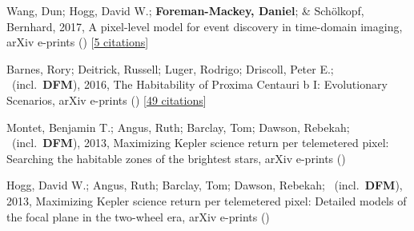 \item[{\color{numcolor}\scriptsize4}] Wang, Dun; Hogg, David W.; \textbf{Foreman-Mackey, Daniel}; \& Sch{\"o}lkopf, Bernhard, 2017, A pixel-level model for event discovery in time-domain imaging, arXiv e-prints () [\href{https://ui.adsabs.harvard.edu/abs/2017arXiv171002428W}{5 citations}]

\item[{\color{numcolor}\scriptsize3}] Barnes, Rory; Deitrick, Russell; Luger, Rodrigo; Driscoll, Peter E.; \etal\ (incl.\ \textbf{DFM}), 2016, The Habitability of Proxima Centauri b I: Evolutionary Scenarios, arXiv e-prints () [\href{https://ui.adsabs.harvard.edu/abs/2016arXiv160806919B}{49 citations}]

\item[{\color{numcolor}\scriptsize2}] Montet, Benjamin T.; Angus, Ruth; Barclay, Tom; Dawson, Rebekah; \etal\ (incl.\ \textbf{DFM}), 2013, Maximizing Kepler science return per telemetered pixel: Searching the habitable zones of the brightest stars, arXiv e-prints ()

\item[{\color{numcolor}\scriptsize1}] Hogg, David W.; Angus, Ruth; Barclay, Tom; Dawson, Rebekah; \etal\ (incl.\ \textbf{DFM}), 2013, Maximizing Kepler science return per telemetered pixel: Detailed models of the focal plane in the two-wheel era, arXiv e-prints ()